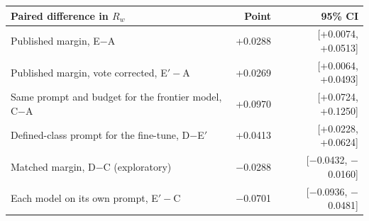 \begin{tabular}{@{}lrr@{}}
\toprule
Paired difference in $R_w$ & Point & 95\% CI \\
\midrule
Published margin, E$-$A & +0.0288 & [+0.0074, +0.0513] \\
Published margin, vote corrected, E$'-$A & +0.0269 & [+0.0064, +0.0493] \\
Same prompt and budget for the frontier model, C$-$A & +0.0970 & [+0.0724, +0.1250] \\
Defined-class prompt for the fine-tune, D$-$E$'$ & +0.0413 & [+0.0228, +0.0624] \\
Matched margin, D$-$C (exploratory) & $-$0.0288 & [$-$0.0432, $-$0.0160] \\
Each model on its own prompt, E$'-$C & $-$0.0701 & [$-$0.0936, $-$0.0481] \\
\bottomrule
\end{tabular}
